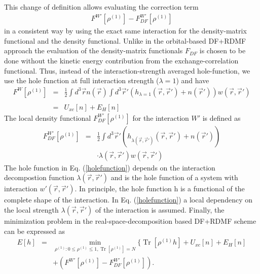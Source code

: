 \documentclass[%
 reprint,
nofootinbib,
 amsmath,amssymb,
 aps,
]{revtex4-2}
\DeclareMathOperator{\Tr}{Tr}
\begin{document}
\break
This change of definition allows evaluating the correction term
\begin{eqnarray}
F^{W'}[\rho^{(1)}]-F^{W'}_{DF}[\rho^{(1)}]
\end{eqnarray}
in a consistent way by using the exact same interaction for the density-matrix functional and the density functional. Unlike in the orbital-based DF+RDMF approach \cite{Bloechl2011} the evaluation of the density-matrix functionals $F_{DF}$ is chosen to be done without the kinetic energy contribution from the exchange-correlation functional. Thus, instead of the interaction-strength averaged hole-function, we use the hole function at full interaction strength ($\lambda=1$) and have 
\begin{eqnarray}
F^{W}[\rho^{(1)}] &=& \frac{1}{2}\int d^3\Vec{r}n(\Vec{r})\int d^3\Vec{r}'(h_{\lambda=1}(\Vec{r},\Vec{r}')+n(\Vec{r}'))w(\Vec{r},\Vec{r}') \nonumber\\
\\
&=& U_{xc}[n]+E_H[n]
\end{eqnarray}
The local density functional $F^{W'}_{DF}[\rho^{(1)}]$ for the interaction $W'$ is defined as 
\begin{eqnarray}
F^{W'}_{DF}[\rho^{(1)}]&=&\frac{1}{2}\int d^3\Vec{r}'(h_{\lambda(\Vec{r},\Vec{r}')}(\Vec{r},\Vec{r}')+n(\Vec{r}'))\nonumber\\
&&\cdot\lambda(\Vec{r},\Vec{r}')w(\Vec{r},\Vec{r}') \label{holefunction}
\end{eqnarray}
The hole function in Eq. (\ref{holefunction}) depends on the interaction decompostion function $\lambda(\Vec{r},\Vec{r}')$ and is the hole function of a system with interaction $w'(\Vec{r},\Vec{r}')$. In principle, the hole function h is a functional of the complete shape of the interaction. In Eq. (\ref{holefunction}) a local dependency on the local strength $\lambda(\Vec{r},\Vec{r}')$ of the interaction is assumed. 
\break 
Finally, the minimization problem in the real-space-decomposition based DF+RDMF scheme can be expressed as 
\begin{eqnarray}
E[h] &=& \min_{\rho^{(1)}:0\leq\rho^{(1)}\leq 1,\Tr[\rho^{(1)}]=N}\{\Tr[\rho^{(1)}h]+U_{xc}[n]+E_H[n]\nonumber\\
&&+(F^{W'}[\rho^{(1)}]-F^{W'}_{DF}[\rho^{(1)}]).
\end{eqnarray}
\end{document}
